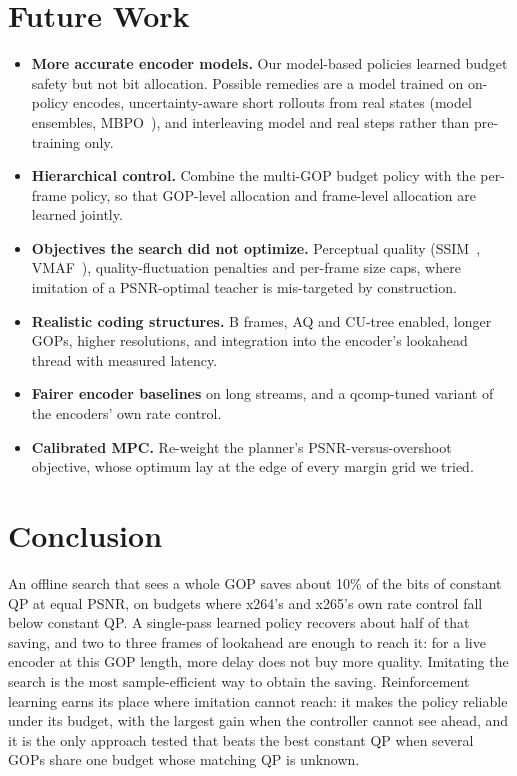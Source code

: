 \documentclass[conference]{IEEEtran}
\begin{document}
\section{Future Work}
\begin{itemize}
\item \textbf{More accurate encoder models.} Our model-based policies learned budget safety but not bit allocation. Possible remedies are a model trained on on-policy encodes, uncertainty-aware short rollouts from real states (model ensembles, MBPO~\cite{janner2019mbpo}), and interleaving model and real steps rather than pre-training only.
\item \textbf{Hierarchical control.} Combine the multi-GOP budget policy with the per-frame policy, so that GOP-level allocation and frame-level allocation are learned jointly.
\item \textbf{Objectives the search did not optimize.} Perceptual quality (SSIM~\cite{wang2004ssim}, VMAF~\cite{li2016vmaf}), quality-fluctuation penalties and per-frame size caps, where imitation of a PSNR-optimal teacher is mis-targeted by construction.
\item \textbf{Realistic coding structures.} B frames, AQ and CU-tree enabled, longer GOPs, higher resolutions, and integration into the encoder's lookahead thread with measured latency.
\item \textbf{Fairer encoder baselines} on long streams, and a qcomp-tuned variant of the encoders' own rate control.
\item \textbf{Calibrated MPC.} Re-weight the planner's PSNR-versus-overshoot objective, whose optimum lay at the edge of every margin grid we tried.
\end{itemize}

\section{Conclusion}
An offline search that sees a whole GOP saves about 10\% of the bits of constant QP at equal PSNR, on budgets where x264's and x265's own rate control fall below constant QP. A single-pass learned policy recovers about half of that saving, and two to three frames of lookahead are enough to reach it: for a live encoder at this GOP length, more delay does not buy more quality. Imitating the search is the most sample-efficient way to obtain the saving. Reinforcement learning earns its place where imitation cannot reach: it makes the policy reliable under its budget, with the largest gain when the controller cannot see ahead, and it is the only approach tested that beats the best constant QP when several GOPs share one budget whose matching QP is unknown.
\end{document}
